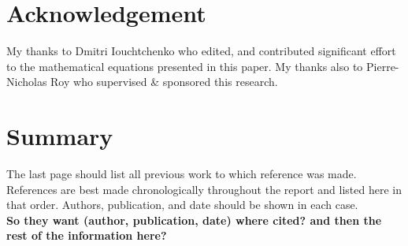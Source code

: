 
\titleGM
\pagestyle{empty}

\clearpage


\doublespacing
\section*{Acknowledgement}
My thanks to Dmitri Iouchtchenko who edited, and contributed significant effort to the mathematical equations presented in this paper. 
My thanks also to Pierre-Nicholas Roy who supervised \& sponsored this research.
\newpage

\section*{Summary}
\newpage

\pagestyle{plain}
\setcounter{page}{1}
\tableofcontents
\newpage

\listoffigures
\newpage

\listoftables
\newpage

\setcounter{page}{1}




\newpage


\newpage


\newpage

\renewcommand*{\bibfont}{\scriptsize}
\printbibliography
The last page should list all previous work to which reference was made.
References are best made chronologically throughout the report and listed here in that order.
Authors, publication, and date should be shown in each case.
\\ \textbf{So they want (author, publication, date) where cited? and then the rest of the information here?}
